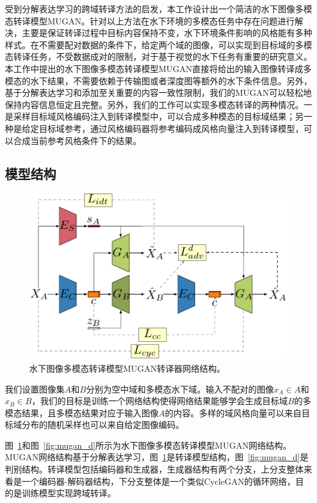 受到分解表达学习的跨域转译方法的启发，本工作设计出一个简洁的水下图像多模态转译模型MUGAN。针对以上方法在水下环境的多模态任务中存在问题进行解决，主要是保证转译过程中目标内容保持不变，水下环境条件影响的风格能有多种样式。在不需要配对数据的条件下，给定两个域的图像，可以实现到目标域的多模态转译任务，不受数据成对的限制，对于基于视觉的水下任务有重要的研究意义。本工作中提出的水下图像多模态转译模型MUGAN直接将给出的输入图像转译成多模态的水下结果，不需要依赖于传输图或者深度图等额外的水下条件信息。另外，基于分解表达学习和添加至关重要的内容一致性限制，我们的MUGAN可以轻松地保持内容信息恒定且完整。另外，我们的工作可以实现多模态转译的两种情况。一是采样目标域风格编码注入到转译模型中，可以合成多种模态的目标域结果；另一种是给定目标域参考，通过风格编码器将参考编码成风格向量注入到转译模型，可以合成当前参考风格条件下的结果。

\subsection{模型结构}

\begin{figure}[ht]
    \centering
    \includegraphics[width=1\textwidth]{figures/G.pdf}
    \caption{水下图像多模态转译模型MUGAN转译器网络结构。}
    \label{fig:mugan_g}
\end{figure}

我们设置图像集$A$和$B$分别为空中域和多模态水下域。输入不配对的图像$x_A \in A$和$x_B \in B$，我们的目标是训练一个网络结构使得网络结果能够学会生成目标域$B$的多模态结果，且多模态结果对应于输入图像$A$的内容。多样的域风格向量可以来自目标域分布的随机采样也可以来自给定图像编码。

图~\ref{fig:mugan_g}和图~\ref{fig:mugan_d}所示为水下图像多模态转译模型MUGAN网络结构。MUGAN网络结构基于分解表达学习，图~\ref{fig:mugan_g}是转译模型结构，图~\ref{fig:mugan_d}是判别结构。转译模型包括编码器和生成器，生成器结构有两个分支，上分支整体来看是一个编码器-解码器结构，下分支整体是一个类似CycleGAN的循环网络，目的是训练模型实现跨域转译。

